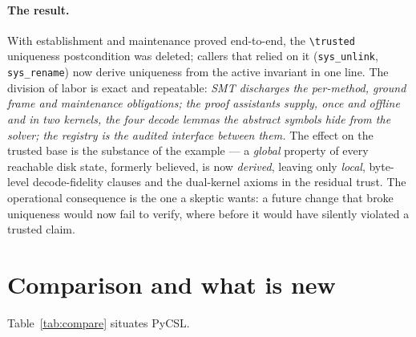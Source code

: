 \documentclass[11pt]{article}
\newcommand{\pycsl}{\textsf{PyCSL}}
\begin{document}
\paragraph{The result.}
With establishment and maintenance proved end-to-end, the
\texttt{\textbackslash trusted} uniqueness postcondition was deleted; callers
that relied on it (\texttt{sys\_unlink}, \texttt{sys\_rename}) now derive
uniqueness from the active invariant in one line. The division of labor is
exact and repeatable: \emph{SMT discharges the per-method, ground frame and
maintenance obligations; the proof assistants supply, once and offline and in
two kernels, the four decode lemmas the abstract symbols hide from the solver;
the registry is the audited interface between them.} The effect on the trusted
base is the substance of the example --- a \emph{global} property of every
reachable disk state, formerly believed, is now \emph{derived}, leaving only
\emph{local}, byte-level decode-fidelity clauses and the dual-kernel axioms in
the residual trust. The operational consequence is the one a skeptic wants: a
future change that broke uniqueness would now fail to verify, where before it
would have silently violated a trusted claim.

\section{Comparison and what is new}\label{sec:comparison}

Table~\ref{tab:compare} situates \pycsl{}.
\end{document}
